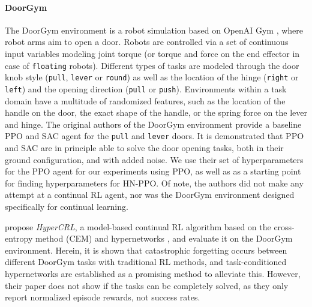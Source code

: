 \documentclass[dvipsnames]{article} %
\newcommand{\comment}[1]{{#1}}
\newcommand{\sa}[1] {\comment{{\color{cyan} SA: #1}}}                %
\newcommand{\commentOLD}[1]{}
\newcommand{\asOLD}[1] {\commentOLD{{\color{orange} AS: #1}}}              %
\begin{document}
\paragraph{DoorGym} %
The DoorGym environment \citep{doorgym} is a robot simulation based on OpenAI Gym \citep{gym}, where robot arms aim to open a door. Robots are controlled via a set of continuous input variables modeling joint torque (or torque and force on the end effector in case of \texttt{floating} robots). Different types of tasks are modeled through the door knob style (\texttt{pull}, \texttt{lever} or \texttt{round}) as well as the location of the hinge (\texttt{right} or \texttt{left}) and the opening direction (\texttt{pull} or \texttt{push}). Environments within a task domain have a multitude of randomized features, such as the location of the handle on the door, the exact shape of the handle, or the spring force on the lever and hinge.
The original authors of the DoorGym environment \citep{doorgym} provide a baseline PPO and SAC agent for the \texttt{pull} and \texttt{lever} doors. It is demonstrated that PPO and SAC are in principle able to solve the door opening tasks, both in their ground configuration, and with added noise. We use their set of hyperparameters for the PPO agent for our experiments using PPO, as well as as a starting point for finding hyperparameters for HN-PPO. Of note, the authors did not make any attempt at a continual RL agent, nor was the DoorGym environment designed specifically for continual learning.

\citet{MBRLHypernetworks} propose \textit{HyperCRL}, a model-based continual RL algorithm based on the cross-entropy method (CEM) \citep{rubinstein1997optimization} and hypernetworks \citep{CLHypernetworks}, and evaluate it on the DoorGym environment. Herein, it is shown that catastrophic forgetting occurs between different DoorGym tasks with traditional RL methods, and task-conditioned hypernetworks are established as a promising method to alleviate this. However, their paper does not show if the tasks can be completely solved, as they only report normalized episode rewards, not success rates.
\end{document}

